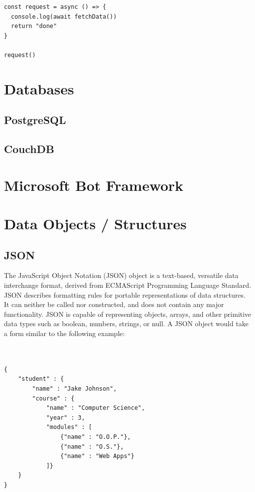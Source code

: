 \begin{verbatim}
const request = async () => {
  console.log(await fetchData())
  return "done"
}

request()
\end{verbatim}
\section{Databases}
\subsection{PostgreSQL}

\subsection{CouchDB}

\section{Microsoft Bot Framework}

\section{Data Objects / Structures}
\subsection{JSON}
	The JavaScript Object Notation (JSON) object is a text-based, versatile data interchange format, derived from ECMAScript Programming Language Standard. JSON describes formatting rules for portable representations of data structures\cite{crockford}. It can neither be called nor constructed, and does not contain any major functionality\cite{ecma}. JSON is capable of representing objects, arrays, and other primitive data types such as boolean, numbers, strings, or null\cite{crockford}.  A JSON object would take a form similar to the following example:
\\
\\
\\
\begin{verbatim}
{
	"student" : {
		"name" : "Jake Johnson",
		"course" : {
			"name" : "Computer Science",
			"year" : 3,
			"modules" : [ 
				{"name" : "O.O.P."},
				{"name" : "O.S."},
				{"name" : "Web Apps"} 
			]}
	}
}
\end{verbatim}

